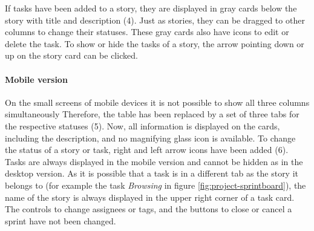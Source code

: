 \documentclass[
	accentcolor=tud1a %
]{tudreport}
\begin{document}
If tasks have been added to a story, they are displayed in gray cards below the story with title and description (4). Just as stories, they can be dragged to other columns to change their statuses. These gray cards also have icons to edit or delete the task. To show or hide the tasks of a story, the arrow pointing down or up on the story card can be clicked.

\paragraph{Mobile version}

On the small screens of mobile devices it is not possible to show all three columns simultaneously Therefore, the table has been replaced by a set of three tabs for the respective statuses (5). Now, all information is displayed on the cards, including the description, and no magnifying glass icon is available. To change the status of a story or task, right and left arrow icons have been added (6). Tasks are always displayed in the mobile version and cannot be hidden as in the desktop version. As it is possible that a task is in a different tab as the story it belongs to (for example the task \emph{Browsing} in figure \ref{fig:project-sprintboard}), the name of the story is always displayed in the upper right corner of a task card. The controls to change assignees or tags, and the buttons to close or cancel a sprint have not been changed.
\end{document}
